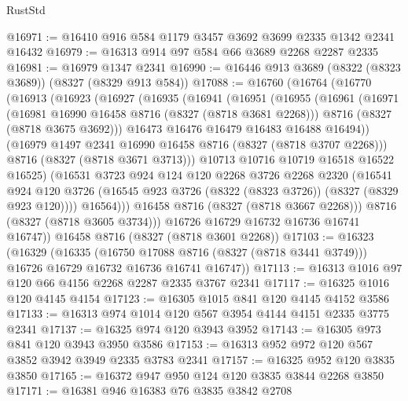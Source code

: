 \begin{lexlean}{RustStd}
\begin{coremodule}
{\begin{coremodule}
{{{{{{{{{{{{{{{{{{{{{{{{{{{{{{{{{{{{{{{{{{{{{{{{{{{{{{@16971 := @16410 @916 @584 @1179 @3457 @3692 @3699 @2335 @1342 @2341 @16432
@16979 := @16313 @914 @97 @584 @66 @3689 @2268 @2287 @2335
@16981 := @16979 @1347 @2341
@16990 := @16446 @913 @3689 (@8322 (@8323 @3689)) (@8327 (@8329 @913 @584))
@17088 := @16760
    (@16764
      (@16770
        (@16913
          (@16923
            (@16927
              (@16935
                (@16941
                  (@16951
                    (@16955
                      (@16961
                        (@16971
                          (@16981 @16990 @16458 @8716 (@8327 (@8718 @3681 @2268)))
                          @8716
                          (@8327 (@8718 @3675 @3692)))
                        @16473
                        @16476
                        @16479
                        @16483
                        @16488
                        @16494))
                    (@16979 @1497 @2341 @16990 @16458 @8716 (@8327 (@8718 @3707 @2268)))
                    @8716
                    (@8327 (@8718 @3671 @3713)))
                  @10713
                  @10716
                  @10719
                  @16518
                  @16522
                  @16525)
                (@16531
                  @3723
                  @924
                  @124
                  @120
                  @2268
                  @3726
                  @2268
                  @2320
                  (@16541
                    @924
                    @120
                    @3726
                    (@16545 @923 @3726 (@8322 (@8323 @3726)) (@8327 (@8329 @923 @120))))
                  @16564)))
            @16458
            @8716
            (@8327 (@8718 @3667 @2268)))
          @8716
          (@8327 (@8718 @3605 @3734)))
        @16726
        @16729
        @16732
        @16736
        @16741
        @16747))
    @16458
    @8716
    (@8327 (@8718 @3601 @2268))
@17103 := @16323
    (@16329
      (@16335
        (@16750 @17088 @8716 (@8327 (@8718 @3441 @3749)))
        @16726
        @16729
        @16732
        @16736
        @16741
        @16747))
@17113 := @16313 @1016 @97 @120 @66 @4156 @2268 @2287 @2335 @3767 @2341
@17117 := @16325 @1016 @120 @4145 @4154
@17123 := @16305 @1015 @841 @120 @4145 @4152 @3586
@17133 := @16313 @974 @1014 @120 @567 @3954 @4144 @4151 @2335 @3775 @2341
@17137 := @16325 @974 @120 @3943 @3952
@17143 := @16305 @973 @841 @120 @3943 @3950 @3586
@17153 := @16313 @952 @972 @120 @567 @3852 @3942 @3949 @2335 @3783 @2341
@17157 := @16325 @952 @120 @3835 @3850
@17165 := @16372 @947 @950 @124 @120 @3835 @3844 @2268 @3850
@17171 := @16381 @946 @16383 @76 @3835 @3842 @2708
}}}}}}}}}}}}}}}}}}}}}}}}}}}}}}}}}}}}}}}}}}}}}}}}}}}}}}
\end{coremodule}}
\end{coremodule}
\end{lexlean}

